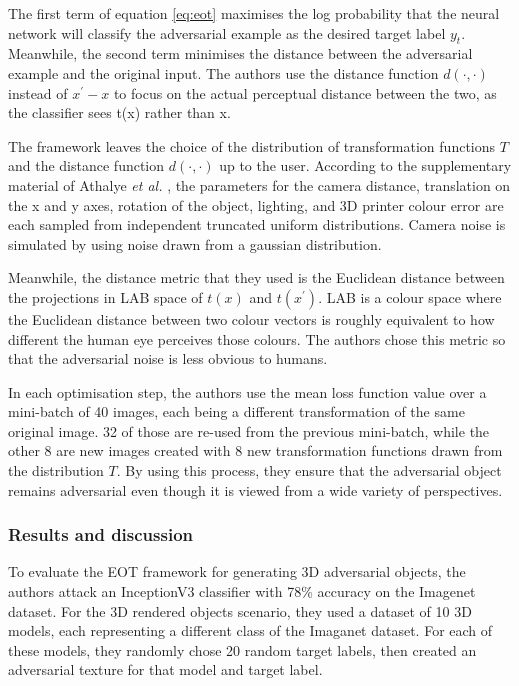 The first term of equation \ref{eq:eot} maximises the log probability that the neural network will classify the adversarial example as the desired target label $y_{t}$. Meanwhile, the second term minimises the distance between the adversarial example and the original input. The authors use the distance function $d(\cdot, \cdot)$ instead of $x^\prime - x$ to focus on the actual perceptual distance between the two, as the classifier sees t(x) rather than x.

The framework leaves the choice of the distribution of transformation functions $T$ and the distance function $d(\cdot, \cdot)$ up to the user. According to the supplementary material of Athalye \textit{et al.} \cite{athalye}, the parameters for the camera distance, translation on the x and y axes, rotation of the object, lighting, and 3D printer colour error are each sampled from independent truncated uniform distributions. Camera noise is simulated by using noise drawn from a gaussian distribution.

Meanwhile, the distance metric that they used is the Euclidean distance between the projections in LAB space of $t(x)$ and $t(x^\prime)$. LAB \cite{lab} is a colour space where the Euclidean distance between two colour vectors is roughly equivalent to how different the human eye perceives those colours. The authors chose this metric so that the adversarial noise is less obvious to humans. 

In each optimisation step, the authors use the mean loss function value over a mini-batch of 40 images, each being a different transformation of the same original image. 32 of those are re-used from the previous mini-batch, while the other 8 are new images created with 8 new transformation functions drawn from the distribution $T$. By using this process, they ensure that the adversarial object remains adversarial even though it is viewed from a wide variety of perspectives.

\subsubsection{Results and discussion}
    \label{subsubsec:eot_results}

To evaluate the EOT framework for generating 3D adversarial objects, the authors attack an InceptionV3 classifier \cite{inceptionv3} with 78\% accuracy on the Imagenet dataset. For the 3D rendered objects scenario, they used a dataset of 10 3D models, each representing a different class of the Imaganet dataset. For each of these models, they randomly chose 20 random target labels, then created an adversarial texture for that model and target label. 

